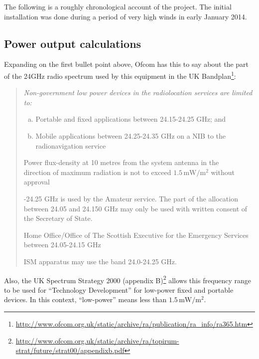 The following is a roughly chronological account of the project.
The initial installation was done during a period of very high winds
in early January 2014.

\subsection{Power output calculations}

Expanding on the first bullet point above,
Ofcom has this to say about the part
of the 24GHz radio spectrum used by this equipment in the
UK Bandplan\footnote{\url{http://www.ofcom.org.uk/static/archive/ra/publication/ra_info/ra365.htm}}:

\begin{quotation}
  \itshape
  Non-government low power devices in the radiolocation services are
  limited to:
  
  \vspace{\baselineskip}\noindent
  \begin{enumerate}[(a)]
  \item Portable and fixed applications between 24.15-24.25 GHz; and
  \item Mobile applications between 24.25-24.35 GHz on a NIB to the
    radionavigation service
  \end{enumerate}

  \vspace{\baselineskip}\noindent
  Power flux-density at 10 metres from the system antenna in the\\
  direction of maximum radiation is not to exceed $1.5\,\text{mW}/\text{m}^2$
  without approval

  \vspace{\baselineskip}-24.25 GHz is used by the Amateur service. The part of the
  allocation between 24.05 and 24.150 GHz may only be used with
  written consent of the Secretary of State.

  \vspace{\baselineskip}\noindent
  Home Office/Office of The Scottish Executive for the Emergency
  Services between 24.05-24.15 GHz

  \vspace{\baselineskip}\noindent
  ISM apparatus may use the band 24.0-24.25 GHz.
\end{quotation}

\vspace{\baselineskip}
Also, the UK
Spectrum Strategy 2000 (appendix
B)\footnote{\url{http://www.ofcom.org.uk/static/archive/ra/topirum-strat/future/strat00/appendixb.pdf}}
allows this frequency range to be
used for ``Technology Development'' for low-power fixed and portable
devices. In this context, ``low-power'' means less than
$1.5\,\text{mW}/\text{m}^2$.

